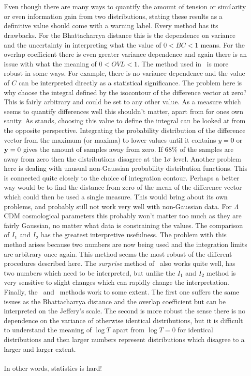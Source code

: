 \documentclass[twocolumn]{revtex4-1}
\begin{document}
    \\
    \\
    Even though there are many ways to quantify the amount of tension or similarity or even information gain from two distributions, stating these results as a definitive value should come with a warning label.
    Every method has its drawbacks.
    For the Bhattacharrya distance this is the dependence on variance and the uncertainty in interpreting what the value of $0<BC<1$ means.
    For the overlap coefficient there is even greater variance dependence and again there is an issue with what the meaning of $0<OVL<1$.
    The method used in~\cite{Battye:2014qga} is more robust in some ways.
    For example, there is no variance dependence and the value of $C$ can be interpreted directly as a statistical significance.
    The problem here is why choose the integral defined by the isocontour of the difference vector at zero?
    This is fairly arbitrary and could be set to any other value.
    As a measure which seems to quantify differences well this shouldn't matter, apart from for ones own sanity.
    As stands, choosing this value to define the integral can be looked at from the opposite perspective.
    Integrating the probability distribution of the difference vector from the maximum (or maxima) to lower values until it contains $y=0 $ or ${\bf y}=0$ gives the amount of samples away from zero. 
    If 68\% of the samples are away from zero then the distributions disagree at the $1\sigma$ level.
    Another problem here is dealing with unusual non-Gaussian probability distribution functions.
    This is connected quite closely to the choice of integration contour.
    Perhaps a better way would be to find the distance from zero of the mean of the difference vector which could then be used a single measure.
    This would bring about its own problems, and probably still not work very well with non-Gaussian data.
    For $\Lambda$CDM cosmological parameters this probably won't matter too much as they are fairly Gaussian, no matter what data is constraining the values.
    The comparison of $I_1$ and $I_2$ has the greatest interpretive usefulness.
    The problem with this method arises because two numbers are now being used and the integration limits are arbitrary once again.
    This method seems the most robust of the different procedures described here.
    The \emph{surprise} method of~\cite{Seehars:2014ora} also works quite well, has two numbers which need to be interpreted, but unlike the $I_1$ and $I_2$ method is very sensitive to slight changes which can rapidly change the interpretation.
    Finally, the~\cite{Marshall:2004zd} and~\cite{Verde:2013wza} methods work to some extent.
    The first one suffers the same issues as the Bhattacharrya distance and the overlap coefficient but can be interpreted on the Jeffery's scale.
    The second is more robust the sense there is no dependence on the variance of otherwise identical distributions, but it is difficult to understand the meaning of $\log T$ apart from $\log T=0$ for identical distributions and then larger numbers represent distributions which disagree to a larger and larger extent.
    \\
    \\
    In other words, statistics is hard!


\end{document}
